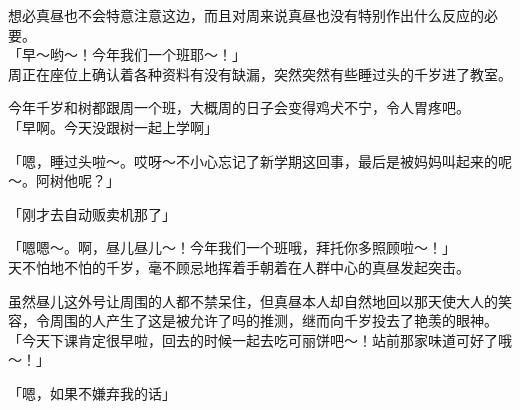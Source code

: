 想必真昼也不会特意注意这边，而且对周来说真昼也没有特别作出什么反应的必要。\\

「早～哟～！今年我们一个班耶～！」\\

周正在座位上确认着各种资料有没有缺漏，突然突然有些睡过头的千岁进了教室。

今年千岁和树都跟周一个班，大概周的日子会变得鸡犬不宁，令人胃疼吧。\\

「早啊。今天没跟树一起上学啊」

「嗯，睡过头啦～。哎呀～不小心忘记了新学期这回事，最后是被妈妈叫起来的呢～。阿树他呢？」

「刚才去自动贩卖机那了」

「嗯嗯～。啊，昼儿昼儿～！今年我们一个班哦，拜托你多照顾啦～！」\\

天不怕地不怕的千岁，毫不顾忌地挥着手朝着在人群中心的真昼发起突击。

虽然昼儿这外号让周围的人都不禁呆住，但真昼本人却自然地回以那天使大人的笑容，令周围的人产生了这是被允许了吗的推测，继而向千岁投去了艳羡的眼神。\\

「今天下课肯定很早啦，回去的时候一起去吃可丽饼吧～！站前那家味道可好了哦～！」

「嗯，如果不嫌弃我的话」\\

